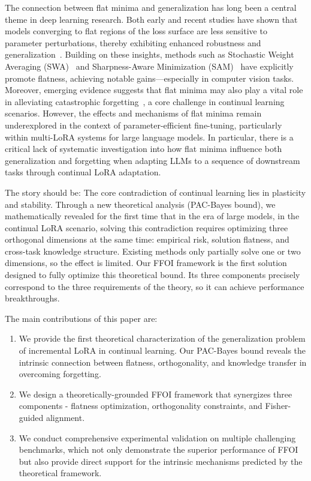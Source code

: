 \documentclass[letterpaper]{article} %
\newcommand{\LYY}[1]{{\color{magenta}{\bf LYY:} #1}}
\begin{document}
The connection between flat minima and generalization has long been a central theme in deep learning research. Both early and recent studies have shown that models converging to flat regions of the loss surface are less sensitive to parameter perturbations, thereby exhibiting enhanced robustness and generalization~. Building on these insights, methods such as Stochastic Weight Averaging (SWA)~ and Sharpness-Aware Minimization (SAM)~ have explicitly promote flatness, achieving notable gains—especially in computer vision tasks. Moreover, emerging evidence suggests that flat minima may also play a vital role in alleviating catastrophic forgetting~\cite{mirzadehUnderstandingRoleTraining2020,JMLRAnEmpiricalInvestigatio}, a core challenge in continual learning scenarios. However, the effects and mechanisms of flat minima remain underexplored in the context of parameter-efficient fine-tuning, particularly within multi-LoRA systems for large language models. In particular, there is a critical lack of systematic investigation into how flat minima influence both generalization and forgetting when adapting LLMs to a sequence of downstream tasks through continual LoRA adaptation.

\LYY{The story should be: The core contradiction of continual learning lies in plasticity and stability. Through a new theoretical analysis (PAC-Bayes bound), we mathematically revealed for the first time that in the era of large models, in the continual LoRA scenario, solving this contradiction requires optimizing three orthogonal dimensions at the same time: empirical risk, solution flatness, and cross-task knowledge structure. Existing methods only partially solve one or two dimensions, so the effect is limited. Our FFOI framework is the first solution designed to fully optimize this theoretical bound. Its three components precisely correspond to the three requirements of the theory, so it can achieve performance breakthroughs.}

The main contributions of this paper are: 
\begin{enumerate}
    \item \LYY{We provide the first theoretical characterization of the generalization problem of incremental LoRA in continual learning. Our PAC-Bayes bound reveals the intrinsic connection between flatness, orthogonality, and knowledge transfer in overcoming forgetting.}
    \item \LYY{We design a theoretically-grounded FFOI framework that synergizes three components - flatness optimization, orthogonality constraints, and Fisher-guided alignment.}
    \item \LYY{We conduct comprehensive experimental validation on multiple challenging benchmarks, which not only demonstrate the superior performance of FFOI but also provide direct support for the intrinsic mechanisms predicted by the theoretical framework.}
\end{enumerate}
\end{document}
